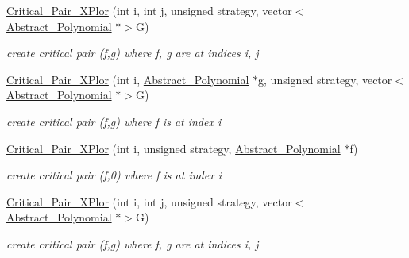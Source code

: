 \begin{Indent}
\begin{DoxyCompactItemize}
\mbox{\label{group___g_b_computation_af5d0947e70b4070f796f1b0d8ce75484}} 
\hyperlink{group___g_b_computation_af5d0947e70b4070f796f1b0d8ce75484}{Critical\+\_\+\+Pair\+\_\+\+X\+Plor} (int i, int j, unsigned strategy, vector$<$ \hyperlink{group__polygroup_class_abstract___polynomial}{Abstract\+\_\+\+Polynomial} $\ast$$>$G)
\begin{DoxyCompactList}\small\item\em create critical pair (f,g) where f, g are at indices {\ttfamily i}, {\ttfamily j} \end{DoxyCompactList}\item 
\mbox{\label{group___g_b_computation_a1cafe8e84ec3bee5e63370b7b815ba71}} 
\hyperlink{group___g_b_computation_a1cafe8e84ec3bee5e63370b7b815ba71}{Critical\+\_\+\+Pair\+\_\+\+X\+Plor} (int i, \hyperlink{group__polygroup_class_abstract___polynomial}{Abstract\+\_\+\+Polynomial} $\ast$g, unsigned strategy, vector$<$ \hyperlink{group__polygroup_class_abstract___polynomial}{Abstract\+\_\+\+Polynomial} $\ast$$>$G)
\begin{DoxyCompactList}\small\item\em create critical pair (f,g) where f is at index {\ttfamily i} \end{DoxyCompactList}\item 
\mbox{\label{group___g_b_computation_ac1564546db9b4736444a614970c1796d}} 
\hyperlink{group___g_b_computation_ac1564546db9b4736444a614970c1796d}{Critical\+\_\+\+Pair\+\_\+\+X\+Plor} (int i, unsigned strategy, \hyperlink{group__polygroup_class_abstract___polynomial}{Abstract\+\_\+\+Polynomial} $\ast$f)
\begin{DoxyCompactList}\small\item\em create critical pair (f,0) where f is at index {\ttfamily i} \end{DoxyCompactList}\item 
\mbox{\label{group___g_b_computation_af5d0947e70b4070f796f1b0d8ce75484}} 
\hyperlink{group___g_b_computation_af5d0947e70b4070f796f1b0d8ce75484}{Critical\+\_\+\+Pair\+\_\+\+X\+Plor} (int i, int j, unsigned strategy, vector$<$ \hyperlink{group__polygroup_class_abstract___polynomial}{Abstract\+\_\+\+Polynomial} $\ast$$>$G)
\begin{DoxyCompactList}\small\item\em create critical pair (f,g) where f, g are at indices {\ttfamily i}, {\ttfamily j} \end{DoxyCompactList}\item 
$$
\end{DoxyCompactItemize}
\end{Indent}
